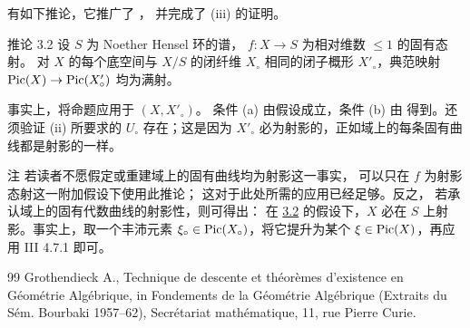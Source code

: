 有如下推论，它推广了 ，
并完成了  (iii) 的证明。

\begin{enonce*}{推论 3.2}
设 $S$ 为 Noether Hensel 环的谱，
$f:X\rightarrow S$ 为相对维数 $\leq1$ 的固有态射。
对 $X$ 的每个底空间与 $X/S$ 的闭纤维\pageoriginale
$X_{\circ}$ 相同的闭子概形 $X'_{\circ}$，典范映射
$\operatorname{Pic}(X)\rightarrow\operatorname{Pic}(X'_{\circ})$ 均为满射。
\end{enonce*}

事实上，将命题应用于 $(X,X'_{\circ})$。
条件 (a) 由假设成立，条件 (b) 由
 得到。还须验证
(ii) 所要求的 $U_{\circ}$ 存在；这是因为
$X'_{\circ}$ 必为射影的，正如域上的每条固有曲线都是射影的一样。

\begin{enonce*}[remark]{注}
若读者不愿假定或重建域上的固有曲线均为射影这一事实，
可以只在 $f$ 为射影态射这一附加假设下使用此推论；
这对于此处所需的应用已经足够。反之，
若承认域上的固有代数曲线的射影性，则可得出：
在 \hyperref[XIII.cor3.2]{3.2} 的假设下，$X$
必在 $S$ 上射影。事实上，取一个丰沛元素
$\xi_{\circ}\in\operatorname{Pic}(X_{\circ})$，将它提升为某个
$\xi\in\operatorname{Pic}(X)$，再应用 \EGA III 4.7.1 即可。
\end{enonce*}

\begin{thebibliography}{99}
 Grothendieck A., Technique de descente et
théorèmes d'existence en Géométrie Algébrique, in Fondements de la
Géométrie Algébrique (Extraits du Sém. Bourbaki 1957--62), Secrétariat
mathématique, 11, rue Pierre Curie.
\end{thebibliography}

